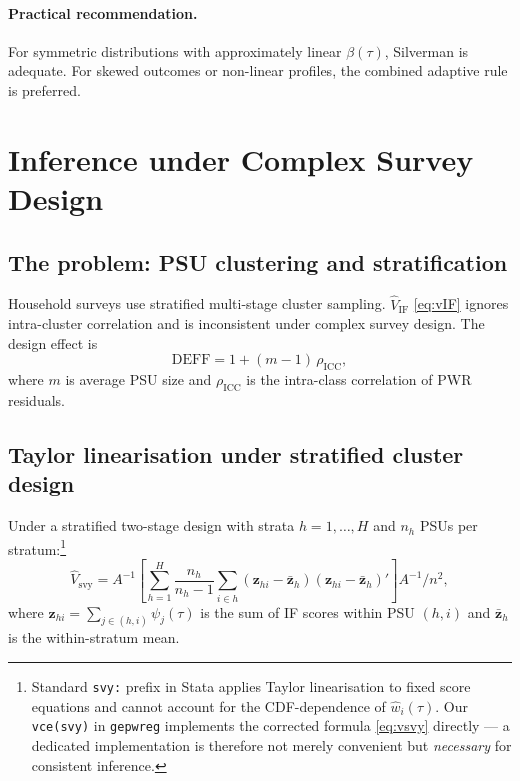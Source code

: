 \documentclass[12pt,a4paper]{article}
\theoremstyle{definition}
\newcommand{\hw}{\hat{w}}
\begin{document}
\paragraph{Practical recommendation.}
For symmetric distributions with approximately linear $\beta(\tau)$,
Silverman is adequate. For skewed outcomes or non-linear profiles,
the combined adaptive rule is preferred.

\section{Inference under Complex Survey Design}
\label{sec:svy}

\subsection{The problem: PSU clustering and stratification}

Household surveys use stratified multi-stage cluster sampling.
$\hat{V}_{\mathrm{IF}}$ \eqref{eq:vIF} ignores intra-cluster
correlation and is inconsistent under complex survey design.
The design effect is
\begin{equation}
  \mathrm{DEFF} = 1 + (m-1)\,\rho_{\mathrm{ICC}},
  \label{eq:deff}
\end{equation}
where $m$ is average PSU size and $\rho_{\mathrm{ICC}}$ is the
intra-class correlation of PWR residuals.

\subsection{Taylor linearisation under stratified cluster design}

Under a stratified two-stage design with strata $h=1,\ldots,H$ and
$n_h$ PSUs per stratum:\footnote{Standard \texttt{svy:} prefix in Stata
applies Taylor linearisation to fixed score equations and cannot account
for the CDF-dependence of $\hw_i(\tau)$. Our \texttt{vce(svy)} in
\texttt{gepwreg} implements the corrected formula \eqref{eq:vsvy}
directly --- a dedicated implementation is therefore not merely
convenient but \textit{necessary} for consistent inference.}
\begin{equation}
  \hat{V}_{\mathrm{svy}} = A^{-1}\!
  \left[\sum_{h=1}^H \frac{n_h}{n_h-1}
  \sum_{i\in h}(\mathbf{z}_{hi}-\bar{\mathbf{z}}_h)
               (\mathbf{z}_{hi}-\bar{\mathbf{z}}_h)'\right]
  A^{-1}/n^2,
  \label{eq:vsvy}
\end{equation}
where $\mathbf{z}_{hi}=\sum_{j\in(h,i)}\psi_j(\tau)$ is the sum of IF
scores within PSU $(h,i)$ and $\bar{\mathbf{z}}_h$ is the
within-stratum mean.
\end{document}
